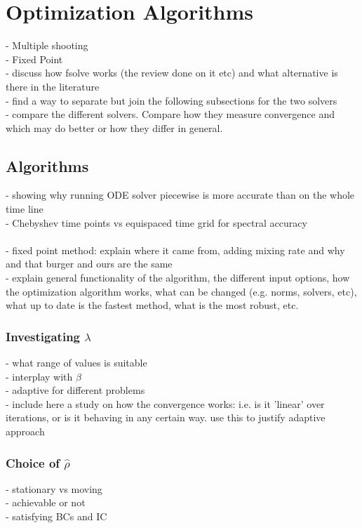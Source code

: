 \documentclass[11pt, a4paper]{article}
\theoremstyle{definition}
\begin{document}
\section{Optimization Algorithms}
- Multiple shooting\\
- Fixed Point\\
- discuss how fsolve works (the review done on it etc) and what alternative is there in the literature\\
- find a way to separate but join the following subsections for the two solvers\\
- compare the different solvers. Compare how they measure convergence and which may do better or how they differ in general.
\subsection{Algorithms}
- showing why running ODE solver piecewise is more accurate than on the whole time line\\
- Chebyshev time points vs equispaced time grid for spectral accuracy\\
\\
- fixed point method: explain where it came from, adding mixing rate and why and that burger and ours are the same\\

- explain general functionality of the algorithm, the different input options, how the optimization algorithm works, what can be changed (e.g. norms, solvers, etc), what up to date is the fastest method, what is the most robust, etc.
\subsubsection{Investigating $\lambda$}
- what range of values is suitable\\
- interplay with $\beta$\\
- adaptive for different problems\\
- include here a study on how the convergence works: i.e. is it 'linear' over iterations, or is it behaving in any certain way. use this to justify adaptive approach
\subsubsection{Choice of $\hat \rho$}
- stationary vs moving\\
- achievable or not\\
- satisfying BCs and IC
\end{document}
